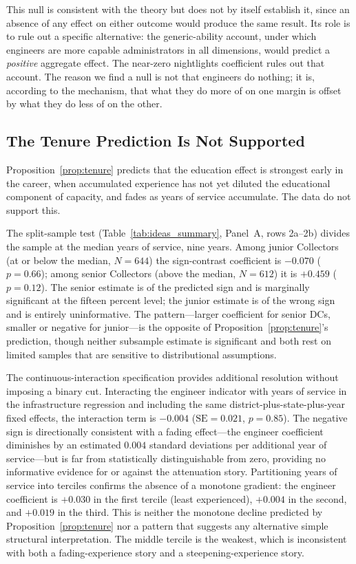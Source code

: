 This null is consistent with the theory but does not by itself establish it, since an
absence of any effect on either outcome would produce the same result. Its role is
to rule out a specific alternative: the generic-ability account, under which engineers
are more capable administrators in all dimensions, would predict a \emph{positive}
aggregate effect. The near-zero nightlights coefficient rules out that account. The
reason we find a null is not that engineers do nothing; it is, according to the
mechanism, that what they do more of on one margin is offset by what they do less of
on the other.

\subsection{The Tenure Prediction Is Not Supported}
\label{sec:results-tenure}

Proposition~\ref{prop:tenure} predicts that the education effect is strongest early
in the career, when accumulated experience has not yet diluted the educational
component of capacity, and fades as years of service accumulate. The data do not
support this.

The split-sample test (Table~\ref{tab:ideas_summary}, Panel~A, rows 2a--2b) divides
the sample at the median years of service, nine years. Among junior Collectors (at or
below the median, $N=644$) the sign-contrast coefficient is $-0.070$ ($p=0.66$);
among senior Collectors (above the median, $N=612$) it is $+0.459$ ($p=0.12$). The
senior estimate is of the predicted sign and is marginally significant at the fifteen
percent level; the junior estimate is of the wrong sign and is entirely uninformative.
The pattern---larger coefficient for senior DCs, smaller or negative for junior---is
the opposite of Proposition~\ref{prop:tenure}'s prediction, though neither subsample
estimate is significant and both rest on limited samples that are sensitive to
distributional assumptions.

The continuous-interaction specification provides additional resolution without
imposing a binary cut. Interacting the engineer indicator with years of service in
the infrastructure regression and including the same district-plus-state-plus-year
fixed effects, the interaction term is $-0.004$ ($\text{SE}=0.021$, $p=0.85$). The
negative sign is directionally consistent with a fading effect---the engineer
coefficient diminishes by an estimated $0.004$ standard deviations per additional
year of service---but is far from statistically distinguishable from zero, providing
no informative evidence for or against the attenuation story. Partitioning years of
service into terciles confirms the absence of a monotone gradient: the engineer
coefficient is $+0.030$ in the first tercile (least experienced), $+0.004$ in the
second, and $+0.019$ in the third. This is neither the monotone decline predicted by
Proposition~\ref{prop:tenure} nor a pattern that suggests any alternative simple
structural interpretation. The middle tercile is the weakest, which is inconsistent
with both a fading-experience story and a steepening-experience story.

